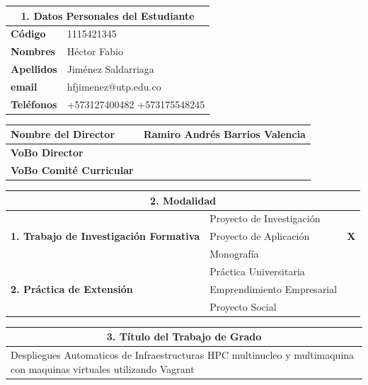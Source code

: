 \documentclass[letter,12pt]{article}
\begin{document}
\sloppy %
\renewcommand{\arraystretch}{1.1} %
\begin{center}
\begin{tabular}{|p{5.5cm}|p{9.5cm}|}
\hline
\multicolumn{2}{|c|}{\textbf{1. Datos Personales del Estudiante}}\\
\hline
\textbf{Código} & 1115421345 \\
\hline
\textbf{Nombres} & Héctor Fabio\\
\hline
\textbf{Apellidos} & Jiménez Saldarriaga\\
\hline
\textbf{email} & hfjimenez@utp.edu.co \\
\hline
\textbf{Teléfonos} & +573127400482 +573175548245 \\
\hline
\end{tabular}
\end{center}

\begin{center}
\begin{tabular}{|p{5.5cm}|p{9.5cm}|}
\hline
\textbf{Nombre del Director} & Ramiro Andrés Barrios Valencia \\
\hline
\textbf{VoBo Director} &  \\
\hline
\textbf{VoBo Comité Curricular} &  \\
\hline
\end{tabular}
\end{center}
\begin{center}
\begin{tabular}{|p{5.5cm}|p{8.5cm}|p{0.5cm}|}
\hline
\multicolumn{3}{|c|}{\textbf{2. Modalidad}}\\
\hline
\multirow{3}{5cm}{\textbf{1. Trabajo de Investigación Formativa}} & Proyecto de Investigación &  \\ \cline{2-3}
& Proyecto de Aplicación &  \textbf{X}\\ \cline{2-3}
& Monografía &  \\ 
\hline
\multirow{3}{5cm}{\textbf{2. Práctica de Extensión}} & Práctica Universitaria &  \\ \cline{2-3}
& Emprendimiento Empresarial &  \\ \cline{2-3}
& Proyecto Social &  \\
\hline
\end{tabular}
\end{center}
\newpage
\begin{center}
\begin{tabular}{|p{15.5cm}|}
\hline
\multicolumn{1}{|c|}{ \textbf{3. Título del Trabajo de Grado}}\\
\hline
Despliegues Automaticos de Infraestructuras HPC multinucleo y multimaquina con maquinas virtuales utilizando Vagrant\\
\hline
\end{tabular}
\end{center}
    
\end{document}
